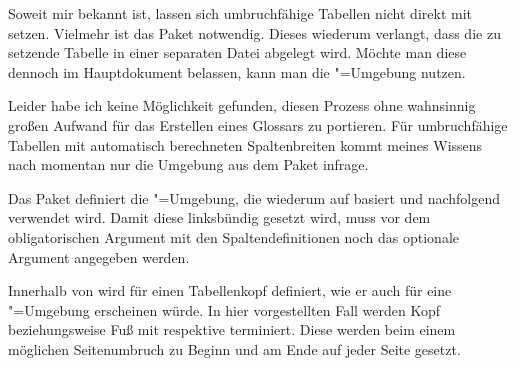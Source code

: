 \documentclass[%
  english,ngerman,%
  geometry=no,DIV=12,automark,%
]{tudscrartcl}
\begin{document}
Soweit mir bekannt ist, lassen sich umbruchfähige Tabellen nicht direkt mit 
 setzen. Vielmehr ist das Paket  
notwendig. Dieses wiederum verlangt, dass die zu setzende Tabelle in einer 
separaten Datei abgelegt wird. Möchte man diese dennoch im Hauptdokument 
belassen, kann man die "=Umgebung nutzen.

Leider habe ich keine Möglichkeit gefunden, diesen Prozess ohne wahnsinnig 
großen Aufwand für das Erstellen eines Glossars zu portieren. Für umbruchfähige 
Tabellen mit automatisch berechneten Spaltenbreiten kommt meines Wissens nach 
momentan nur die Umgebung  aus dem Paket  
infrage.

Das Paket  definiert die "=Umgebung, die 
wiederum auf  basiert und nachfolgend verwendet wird. 
Damit diese linksbündig gesetzt wird, muss vor dem obligatorischen Argument mit 
den Spaltendefinitionen noch das optionale Argument  angegeben 
werden.
%
\CodeHook{\let\newglossarystyle\renewglossarystyle}
\begin{Preamble*}
\end{Preamble*}
%
Innerhalb von  wird  für einen
Tabellenkopf definiert, wie er auch für eine "=Umgebung 
erscheinen würde. In hier vorgestellten Fall werden Kopf beziehungsweise Fuß 
mit  respektive  terminiert. Diese werden beim 
einem möglichen Seitenumbruch zu Beginn und am Ende auf jeder Seite gesetzt.
%
\begin{Preamble+}
}%

\end{Preamble+}
\end{document}
